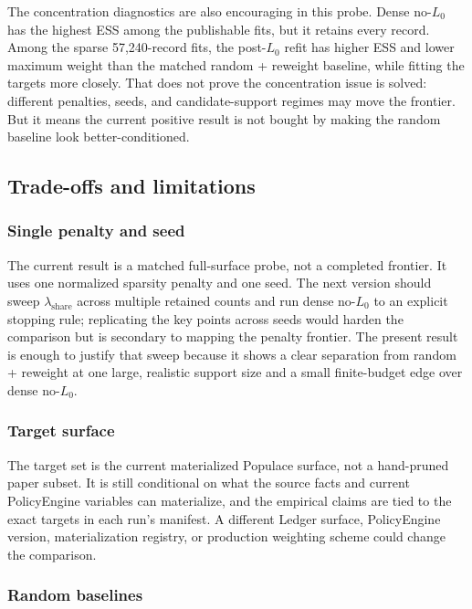 The concentration diagnostics are also encouraging in this probe. Dense no-$L_0$ has the highest ESS among
the publishable fits, but it retains every record. Among the sparse 57{,}240-record fits, the post-$L_0$
refit has higher ESS and lower maximum weight than the matched random + reweight baseline, while fitting
the targets more closely. That does not prove the concentration issue is solved: different penalties,
seeds, and candidate-support regimes may move the frontier. But it means the current positive result is
not bought by making the random baseline look better-conditioned.

\subsection{Trade-offs and limitations}

\subsubsection{Single penalty and seed}

The current result is a matched full-surface probe, not a completed frontier. It uses one normalized
sparsity penalty and one seed. The next version should sweep $\lambda_{\mathrm{share}}$ across multiple
retained counts and run dense no-$L_0$ to an explicit stopping rule; replicating the key points across
seeds would harden the comparison but is secondary to mapping the penalty frontier. The present result is
enough to justify that sweep because it shows
a clear separation from random + reweight at one large, realistic support size and a small finite-budget
edge over dense no-$L_0$.

\subsubsection{Target surface}

The target set is the current materialized Populace surface, not a hand-pruned paper subset. It is still
conditional on what the source facts and current PolicyEngine variables can materialize, and the empirical
claims are tied to the exact targets in each run's manifest. A different Ledger surface, PolicyEngine
version, materialization registry, or production weighting scheme could change the comparison.

\subsubsection{Random baselines}

